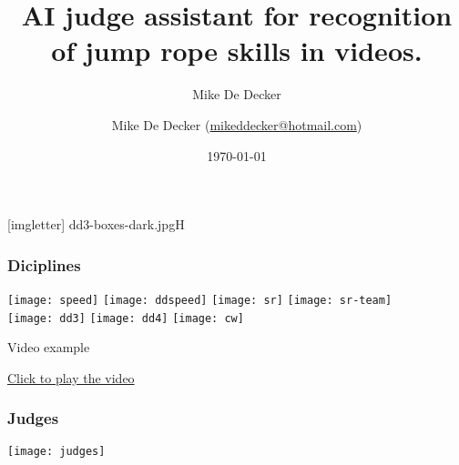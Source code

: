 \documentclass[aspectratio=169]{beamer}
\title[AI Judge]{AI judge assistant for recognition of jump rope skills in videos.}
\author{Mike De Decker}
\author[MDD]{Mike {De Decker} (\href{mailto:mikeddecker@hotmail.com}
    {mikeddecker@hotmail.com})}
\date{\today}
\begin{document}

{
[imgletter]
    {dd3-boxes-dark.jpg}{H}

\begin{frame}
    \maketitle
\end{frame}
}


\begin{frame}
  \frametitle{Diciplines}

  \hspace{0.1cm}\texttt{[image: speed]}
  \hspace{0.1cm}\texttt{[image: ddspeed]}
  \hspace{0.1cm}\texttt{[image: sr]}
  \hspace{0.1cm}\texttt{[image: sr-team]} \\
  \vspace{0.1cm}
  \hspace{0.1cm}\texttt{[image: dd3]}
  \hspace{0.1cm}\texttt{[image: dd4]}
  \hspace{0.1cm}\texttt{[image: cw]}

\end{frame}

\begin{frame}{Video example}


  \href{run:1315_annotated.mp4}{Click to play the video}

  

\end{frame}

\begin{frame}
  \frametitle{Judges}
  \vspace{-1cm}
  \texttt{[image: judges]}
  
\end{frame}
\end{document}
